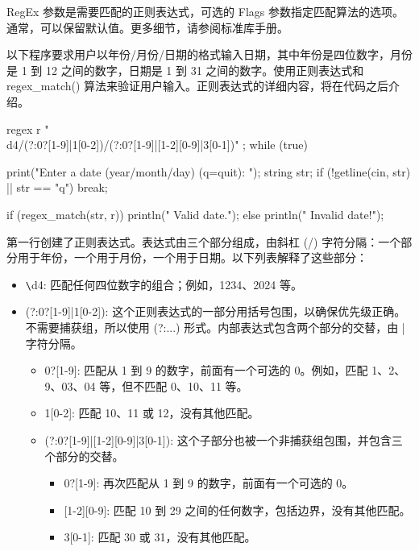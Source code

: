 RegEx 参数是需要匹配的正则表达式，可选的 Flags 参数指定匹配算法的选项。通常，可以保留默认值。更多细节，请参阅标准库手册。


以下程序要求用户以年份/月份/日期的格式输入日期，其中年份是四位数字，月份是 1 到 12 之间的数字，日期是 1 到 31 之间的数字。使用正则表达式和 regex\_match() 算法来验证用户输入。正则表达式的详细内容，将在代码之后介绍。

\begin{cpp}
regex r { "\\d{4}/(?:0?[1-9]|1[0-2])/(?:0?[1-9]|[1-2][0-9]|3[0-1])" };
while (true) {
    print("Enter a date (year/month/day) (q=quit): ");
    string str;
    if (!getline(cin, str) || str == "q") { break; }

    if (regex_match(str, r)) { println(" Valid date."); }
    else { println(" Invalid date!"); }
}
\end{cpp}

第一行创建了正则表达式。表达式由三个部分组成，由斜杠 (/) 字符分隔：一个部分用于年份，一个用于月份，一个用于日期。以下列表解释了这些部分：

\begin{itemize}
\item
\verb|\|d{4}: 匹配任何四位数字的组合；例如，1234、2024 等。

\item
(?:0?[1-9]|1[0-2]): 这个正则表达式的一部分用括号包围，以确保优先级正确。不需要捕获组，所以使用 (?:...) 形式。内部表达式包含两个部分的交替，由 | 字符分隔。
\begin{itemize}
\item
0?[1-9]: 匹配从 1 到 9 的数字，前面有一个可选的 0。例如，匹配 1、2、9、03、04 等，但不匹配 0、10、11 等。

\item
1[0-2]: 匹配 10、11 或 12，没有其他匹配。

\item
(?:0?[1-9]|[1-2][0-9]|3[0-1]): 这个子部分也被一个非捕获组包围，并包含三个部分的交替。
\begin{itemize}
\item
0?[1-9]: 再次匹配从 1 到 9 的数字，前面有一个可选的 0。

\item
{}[1-2][0-9]: 匹配 10 到 29 之间的任何数字，包括边界，没有其他匹配。

\item
3[0-1]: 匹配 30 或 31，没有其他匹配。
\end{itemize}

\end{itemize}

\end{itemize}

